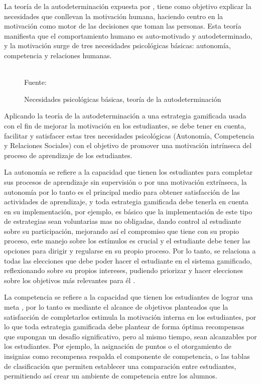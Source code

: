 La teoría de la autodeterminación expuesta por , tiene como objetivo explicar la 
necesidades que conllevan la motivación humana, haciendo centro en la motivación como motor de las decisiones 
que toman las personas. Esta teoría manifiesta que el comportamiento humano es auto-motivado y
autodeterminado, y la motivación surge de tres necesidades psicológicas básicas: autonomía, competencia y 
relaciones humanas.

\begin{figure}[ht]
\caption{Necesidades psicológicas básicas, teoría de la autodeterminación}
\label{img:SDT}
\centering

\\
{\footnotesize Fuente: \citeA<basada en>{deci1985intrinsic}}
\end{figure}

Aplicando la teoría de la autodeterminación a una estrategia gamificada usada con el fin de mejorar la 
motivación en los estudiantes, se debe tener en cuenta, facilitar y satisfacer estas tres necesidades 
psicológicas (Autonomía, Competencia y Relaciones Sociales) con el objetivo de promover una motivación 
intrínseca del proceso de aprendizaje de los estudiantes. 

La autonomía se refiere a la capacidad que tienen los estudiantes para completar sus procesos de aprendizaje 
sin supervisión o por una motivación extrínseca, la autonomía por lo tanto es el principal medio para 
obtener satisfacción de las actividades de aprendizaje, y toda estrategia gamificada debe tenerla en cuenta en 
su implementación, por ejemplo, es básico que la implementación de este tipo de estrategias sean voluntarias 
mas no obligadas, dando control al estudiante sobre su participación, mejorando así el compromiso que tiene 
con su propio proceso, este manejo sobre los estímulos es crucial y el estudiante debe tener las opciones 
para dirigir y regularse en su propio proceso. Por lo tanto, se relaciona a todas las elecciones que debe 
poder hacer el estudiante en el sistema gamificado, reflexionando sobre su propios intereses, pudiendo 
priorizar y hacer elecciones sobre los objetivos más relevantes para él \cite{Rutledge2018}.

La competencia se refiere a la capacidad que tienen los estudiantes de lograr una meta \cite{Rutledge2018}, 
por lo tanto es mediante el alcance de objetivos planteados que la satisfacción de completarlos estimula la 
motivación interna en los estudiantes, por lo que toda estrategia gamificada debe plantear de forma óptima 
recompensas que supongan un desafío significativo, pero al mismo tiempo, sean alcanzables por los estudiantes. 
Por ejemplo, la asignación de puntos o el otorgamiento de insignias como recompensa respalda el componente de 
competencia, o las tablas de clasificación que permiten establecer una comparación entre estudiantes, 
permitiendo así crear un ambiente de competencia entre los alumnos.

